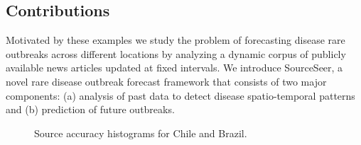 \documentclass[twoside,leqno,twocolumn]{article}
\newcommand{\fullmodel}{{{\sf SourceSeer}}\xspace}
\begin{document}
\subsection{Contributions}
\label{sec:contr}

Motivated by these examples we study the problem of forecasting disease rare outbreaks across different locations by analyzing a dynamic corpus of publicly available news articles updated at fixed intervals. We introduce \fullmodel, a novel rare disease outbreak forecast framework that consists of two major components: (a) analysis of past data to detect disease spatio-temporal patterns and (b) prediction of future outbreaks. 
\begin{figure}[h]
\begin{center}
\end{center}
\caption{Source accuracy histograms for Chile and Brazil.}
\label{fig:src_char}
\end{figure}
\end{document}

